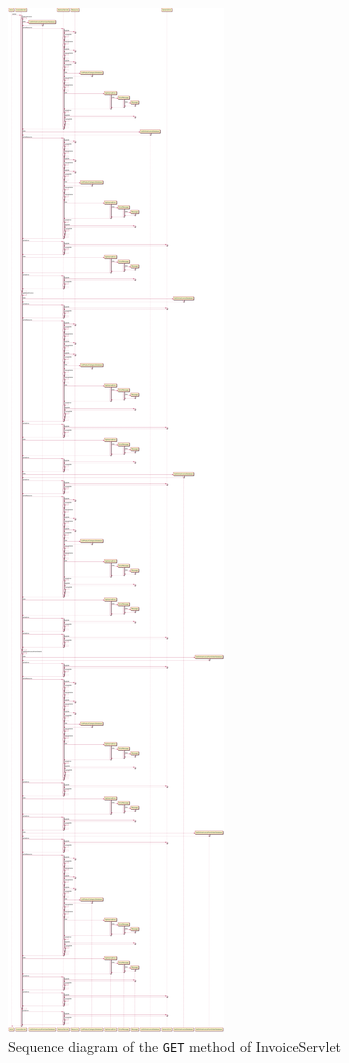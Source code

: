 \begin{figure}[H]
    \centering
    \includegraphics[width=\textwidth,height=0.95\textheight,keepaspectratio]{Schemas/InvoiceServlet_doGet.svg.pdf}
    \caption{Sequence diagram of the \texttt{GET} method of InvoiceServlet}
    \label{fig:InvoiceServlet_doGet}
\end{figure}
